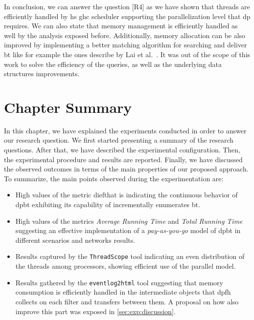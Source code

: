In conclusion, we can answer the question [R4] as we have shown that threads are efficiently handled by \acrshort{hs} \acrshort{ghc} scheduler supporting the parallelization level that \acrshort{dp} requires. 
We can also state that memory management is efficiently handled as well by the analysis exposed before.
Additionally, memory allocation can be also improved by implementing a better matching algorithm for searching and deliver \acrshort{bt} like for example the ones describe by Lai et al.~\cite{Lai}. 
It was out of the scope of this work to solve the efficiency of the queries, as well as the underlying data structures improvements. 


\section{Chapter Summary}
In this chapter, we have explained the experiments conducted in order to answer our research question.
We first started presenting a summary of the research questions. After that, we have described the experimental configuration.
Then, the experimental procedure and results are reported. Finally, we have discussed the observed outcomes in terms of the main properties of our proposed approach.
To summarize, the main points observed during the experimentation are:
\begin{itemize}
  \item High values of the metric dief\@t that is indicating the continuous behavior of \acrshort{dpbt} exhibiting its capability of incrementally enumerates \acrshort{bt}.
  \item High values of the metrics \emph{Average Running Time} and \emph{Total Running Time} suggesting an effective implementation of a \emph{pay-as-you-go} model of \acrshort{dpbt} in  different scenarios and networks results.
  \item Results captured by the \texttt{ThreadScope} tool indicating an even distribution of the threads among processors, showing efficient use of the parallel model.
  \item Results gathered by the \texttt{eventlog2html} tool suggesting that memory consumption is efficiently handled in the intermediate objects that \acrshort{dpfh} collects on each filter and transfers between them. A proposal on how also improve this part was exposed in \autoref{sec:exp:discussion}.
\end{itemize} 

